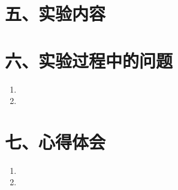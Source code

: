 \documentclass[UTF8, a4paper, 12pt]{ctexart}
\begin{document}
\section{五、实验内容}

\section{六、实验过程中的问题}

\begin{enumerate}
    \item
    \item
\end{enumerate}

\section{七、心得体会}

\begin{enumerate}
    \item
    \item
\end{enumerate}
\end{document}

